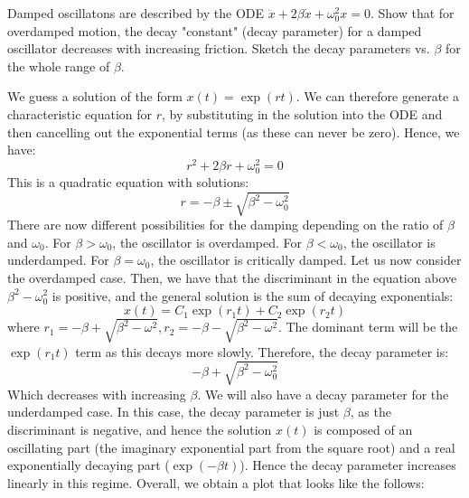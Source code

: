 \begin{p}
Damped oscillatons are described by the ODE $\ddot{x} + 2\beta\dot{x} + \omega_0^2x = 0$. Show that for overdamped motion, the decay "constant" (decay parameter) for a damped oscillator decreases with increasing friction. Sketch the decay parameters vs. $\beta$ for the whole range of $\beta$.
\end{p}
\begin{s}
We guess a solution of the form $x(t) = \exp(rt)$. We can therefore generate a characteristic equation for $r$, by substituting in the solution into the ODE and then cancelling out the exponential terms (as these can never be zero). Hence, we have:
\[r^2 + 2\beta r  + \omega_0^2 = 0\]
This is a quadratic equation with solutions:
\[r = -\beta \pm \sqrt{\beta^2 - \omega_0^2}\]
There are now different possibilities for the damping depending on the ratio of $\beta$ and $\omega_0$. For $\beta > \omega_0$, the oscillator is overdamped. For $\beta < \omega_0$, the oscillator is underdamped. For $\beta = \omega_0$, the oscillator is critically damped. Let us now consider the overdamped case. Then, we have that the discriminant in the equation above $\beta^2 - \omega_0^2$ is positive, and the general solution is the sum of decaying exponentials:
\[x(t) = C_1\exp(r_1 t) + C_2\exp(r_2 t) \]
where $r_1 = -\beta + \sqrt{\beta^2 - \omega^2}, r_2 = -\beta - \sqrt{\beta^2 - \omega^2}$. The dominant term will be the $\exp(r_1 t)$ term as this decays more slowly. Therefore, the decay parameter is:
\[-\beta + \sqrt{\beta^2 -\omega_0^2}\]
Which decreases with increasing $\beta$. We will also have a decay parameter for the underdamped case. In this case, the decay parameter is just $\beta$, as the discriminant is negative, and hence the solution $x(t)$ is composed of an oscillating part (the imaginary exponential part from the square root) and a real exponentially decaying part ($\exp(-\beta t)$). Hence the decay parameter increases linearly in this regime. Overall, we obtain a plot that looks like the follows:


\end{s}
